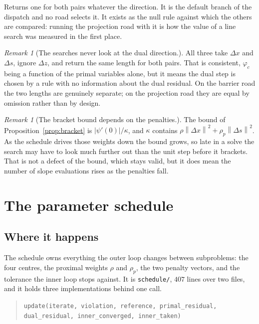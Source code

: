 \documentclass[a4paper,11pt]{book}
\theoremstyle{plain}
\theoremstyle{definition}
\theoremstyle{remark}
\newtheorem{remark}[theorem]{Remark}
\numberwithin{equation}{chapter}
\numberwithin{algorithm}{chapter}
\newcommand{\norm}[1]{\left\|#1\right\|}
\begin{document}
	Returns one for both pairs whatever the direction. It is the default branch of
	the dispatch and no road selects it. It exists as the null rule against which
	the others are compared: running the projection road with it is how the value
	of a line search was measured in the first place.

	\begin{remark}[The searches never look at the dual direction.]
		All three take $\Delta x$ and $\Delta s$, ignore $\Delta z$, and return the
		same length for both pairs. That is consistent, $\varphi_c$ being a function
		of the primal variables alone, but it means the dual step is chosen by a
		rule with no information about the dual residual. On the barrier road the
		two lengths are genuinely separate; on the projection road they are equal by
		omission rather than by design.
	\end{remark}

	\begin{remark}[The bracket bound depends on the penalties.]
		The bound of Proposition~\ref{prop:bracket} is $|\psi'(0)|/\kappa$, and
		$\kappa$ contains $\rho\norm{\Delta x}^2+\rho_p\norm{\Delta s}^2$. As the
		schedule drives those weights down the bound grows, so late in a solve the
		search may have to look much further out than the unit step before it
		brackets. That is not a defect of the bound, which stays valid, but it does
		mean the number of slope evaluations rises as the penalties fall.
	\end{remark}

	\chapter{The parameter schedule}

	\section{Where it happens}

	The schedule owns everything the outer loop changes between subproblems: the
	four centres, the proximal weights $\rho$ and $\rho_p$, the two penalty
	vectors, and the tolerance the inner loop stops against. It is
	\texttt{schedule/}, $407$ lines over two files, and it holds three
	implementations behind one call.

	\begin{quote}
		\texttt{update(iterate, violation, reference, primal\_residual,
			dual\_residual, inner\_converged, inner\_taken)}
	\end{quote}
\end{document}
